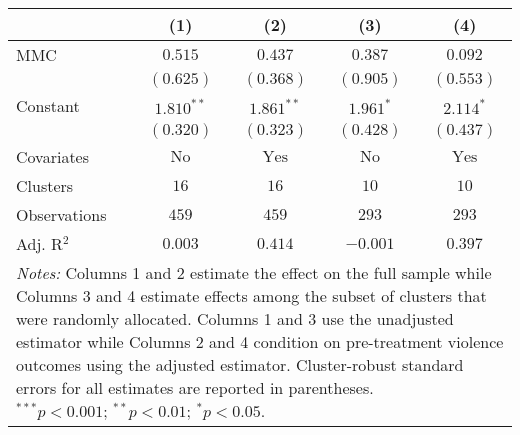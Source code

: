 
\begin{tabular}{l c c c c}
\toprule
 & (1) & (2) & (3) & (4) \\
\midrule
MMC          & $0.515$       & $0.437$        & $0.387$       & $0.092$        \\
             & $(0.625)$     & $(0.368)$      & $(0.905)$     & $(0.553)$      \\
Constant     & $1.810^{**}$  & $1.861^{**}$   & $1.961^{*}$   & $2.114^{*}$    \\
             & $(0.320)$     & $(0.323)$      & $(0.428)$     & $(0.437)$      \\
\midrule
Covariates   & $\textrm{No}$ & $\textrm{Yes}$ & $\textrm{No}$ & $\textrm{Yes}$ \\
Clusters     & $16$          & $16$           & $10$          & $10$           \\
Observations & $459$         & $459$          & $293$         & $293$          \\
Adj. R$^2$   & $0.003$       & $0.414$        & $-0.001$      & $0.397$        \\
\bottomrule
\multicolumn{5}{l}{\scriptsize{\parbox{.5\linewidth}{\vspace{2pt} 
       \textit{Notes:} Columns 1 and 2 estimate the effect on the full sample while Columns 3 
       and 4 estimate effects among the subset of clusters that were randomly allocated.
       Columns 1 and 3 use the unadjusted estimator while Columns 2 and 4 condition on 
       pre-treatment violence outcomes using the adjusted estimator. Cluster-robust 
       standard errors for all estimates are reported in parentheses. \\ $^{***}p<0.001$; $^{**}p<0.01$; $^{*}p<0.05$.}}}
\end{tabular}
